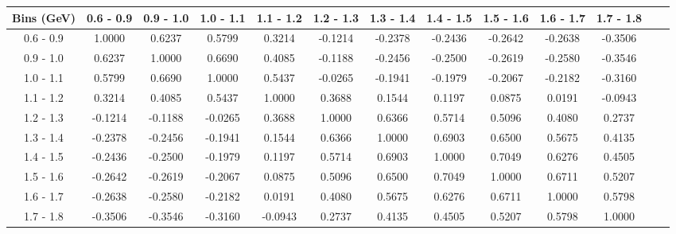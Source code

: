 \documentclass[aps, prd, reprint,showpacs,  preprintnumbers,amsmath,amssymb,superscriptaddress, nofootinbib]{revtex4-1}
\makeatletter
\renewenvironment{table}
  {\def\@captype{table}}
  {}
\makeatother
\begin{document}
\begin{table}
\centering
\begin{tabular}{ccccccccccccc}
\hline
    Bins (GeV) &    0.6 - 0.9 &    0.9 - 1.0 &    1.0 - 1.1 &    1.1 - 1.2 &    1.2 - 1.3 &    1.3 - 1.4 &    1.4 - 1.5 &    1.5 - 1.6 &    1.6 - 1.7 &    1.7 - 1.8 \\ 
\hline
  0.6 -  0.9  & 1.0000  & 0.6237  & 0.5799  & 0.3214  &-0.1214  &-0.2378  &-0.2436  &-0.2642  &-0.2638  &-0.3506 \\
  0.9 -  1.0  & 0.6237  & 1.0000  & 0.6690  & 0.4085  &-0.1188  &-0.2456  &-0.2500  &-0.2619  &-0.2580  &-0.3546 \\
  1.0 -  1.1  & 0.5799  & 0.6690  & 1.0000  & 0.5437  &-0.0265  &-0.1941  &-0.1979  &-0.2067  &-0.2182  &-0.3160 \\
  1.1 -  1.2  & 0.3214  & 0.4085  & 0.5437  & 1.0000  & 0.3688  & 0.1544  & 0.1197  & 0.0875  & 0.0191  &-0.0943 \\
  1.2 -  1.3  &-0.1214  &-0.1188  &-0.0265  & 0.3688  & 1.0000  & 0.6366  & 0.5714  & 0.5096  & 0.4080  & 0.2737 \\
  1.3 -  1.4  &-0.2378  &-0.2456  &-0.1941  & 0.1544  & 0.6366  & 1.0000  & 0.6903  & 0.6500  & 0.5675  & 0.4135 \\
  1.4 -  1.5  &-0.2436  &-0.2500  &-0.1979  & 0.1197  & 0.5714  & 0.6903  & 1.0000  & 0.7049  & 0.6276  & 0.4505 \\
  1.5 -  1.6  &-0.2642  &-0.2619  &-0.2067  & 0.0875  & 0.5096  & 0.6500  & 0.7049  & 1.0000  & 0.6711  & 0.5207 \\
  1.6 -  1.7  &-0.2638  &-0.2580  &-0.2182  & 0.0191  & 0.4080  & 0.5675  & 0.6276  & 0.6711  & 1.0000  & 0.5798 \\
  1.7 -  1.8  &-0.3506  &-0.3546  &-0.3160  &-0.0943  & 0.2737  & 0.4135  & 0.4505  & 0.5207  & 0.5798  & 1.0000 \\
\hline
\hline
\end{tabular}
\caption{Correlation matrix for bins of $d\sigma/dW$.}
\label{tb:piz-W-cov}
\end{table}

\vspace{0.3cm}
\end{document}
